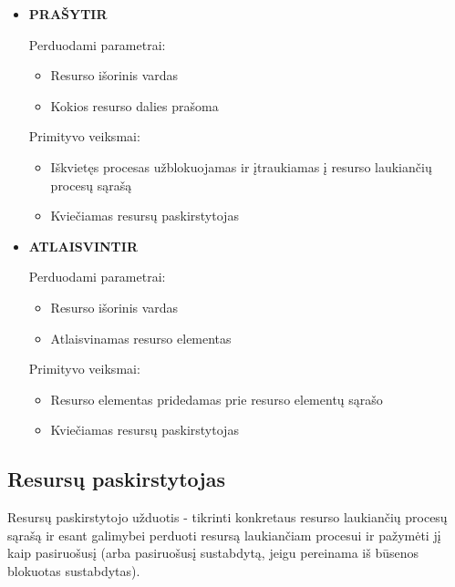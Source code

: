 \documentclass{scrartcl}
\begin{document}
\begin{itemize}
        \item \textbf{PRAŠYTIR}
          \par
          Perduodami parametrai:
          \begin{itemize}
            \item Resurso išorinis vardas
            \item Kokios resurso dalies prašoma
          \end{itemize}
          Primityvo veiksmai:
          \begin{itemize}
            \item Iškvietęs procesas užblokuojamas ir įtraukiamas į resurso laukiančių procesų sąrašą
            \item Kviečiamas resursų paskirstytojas
          \end{itemize}

        \item \textbf{ATLAISVINTIR}
          \par
          Perduodami parametrai:
          \begin{itemize}
            \item Resurso išorinis vardas
            \item Atlaisvinamas resurso elementas
          \end{itemize}
          Primityvo veiksmai:
          \begin{itemize}
            \item Resurso elementas pridedamas prie resurso elementų sąrašo
            \item Kviečiamas resursų paskirstytojas
          \end{itemize}
      \end{itemize}
      \subsection{Resursų paskirstytojas}
        Resursų paskirstytojo užduotis - tikrinti konkretaus resurso laukiančių procesų sąrašą ir esant galimybei perduoti resursą laukiančiam procesui ir pažymėti jį kaip pasiruošusį (arba pasiruošusį sustabdytą, jeigu pereinama iš būsenos blokuotas sustabdytas).
\end{document}
